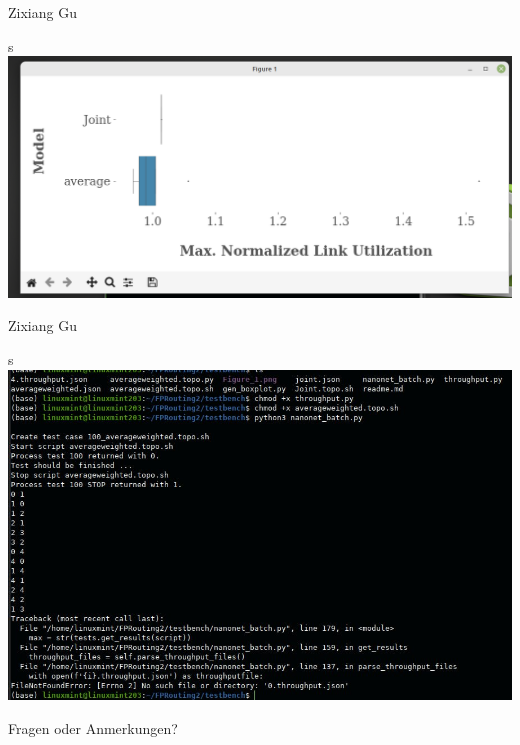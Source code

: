 \documentclass[aspectratio=169,10pt]{beamer}
\begin{document}
\begin{frame}{Zixiang Gu}
\begin{center}s
\includegraphics[width=\textwidth]{images/repr_zixiang_10.png}
\end{center}
\end{frame}
\begin{frame}{Zixiang Gu}
\begin{center}s
\includegraphics[width=\textwidth]{images/repr_zixiang2.jpg}
\end{center}
\end{frame}


\begin{frame}[t,standout]
\Large
Fragen oder Anmerkungen?
\end{frame}
\end{document}
